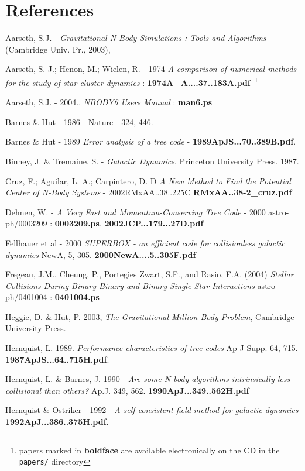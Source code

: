 \chapter                {References}


Aarseth, S.J. - 
{\it Gravitational N-Body Simulations : Tools and Algorithms} 
(Cambridge Univ. Pr., 2003),

Aarseth, S. J.; Henon, M.; Wielen, R. - 1974
{\it A comparison of numerical methods for the study of star cluster 
dynamics} : {\bf 1974A+A....37..183A.pdf}~\footnote{papers marked 
in {\bf boldface} are available electronically on the CD in the {\tt papers/} directory}

Aarseth, S.J. - 2004.. {\it NBODY6 Users Manual} : {\bf man6.ps}

Barnes \& Hut - 1986 - Nature - 324, 446.

Barnes \& Hut - 1989
{\it Error analysis of a tree code} - {\bf 1989ApJS...70..389B.pdf}.

Binney, J. \& Tremaine, S. - {\it Galactic Dynamics}, Princeton University Press. 1987.

Cruz, F.; Aguilar, L. A.; Carpintero, D. D
{\it A New Method to Find the Potential Center of N-Body Systems} - 2002RMxAA..38..225C
{\bf RMxAA..38-2\_cruz.pdf}

Dehnen, W. - {\it A Very Fast and Momentum-Conserving Tree Code} - 2000
astro-ph/0003209 : {\bf 0003209.ps}, {\bf 2002JCP...179...27D.pdf}

Fellhauer et al - 2000 
{\it SUPERBOX - an efficient code for collisionless galactic dynamics}
NewA, 5, 305. {\bf 2000NewA....5..305F.pdf} 

Fregeau, J.M., Cheung, P., Portegies Zwart, S.F., and Rasio, F.A. (2004)
{\it Stellar Collisions During Binary-Binary and Binary-Single Star Interactions}
astro-ph/0401004 : {\bf 0401004.ps}

Heggie, D. \& Hut, P. 2003, 
{\it The Gravitational Million-Body Problem}, 
Cambridge University Press.

Hernquist, L. 1989. {\it Performance characteristics of tree codes} Ap J Supp. 64, 715.
{\bf 1987ApJS...64..715H.pdf}.

Hernquist, L. \& Barnes, J. 1990 - 
{\it Are some N-body algorithms intrinsically less collisional than others?}
Ap.J. 349,  562. {\bf 1990ApJ...349..562H.pdf}

Hernquist \& Ostriker - 1992 - {\it A self-consistent field method for galactic dynamics}
{\bf 1992ApJ...386..375H.pdf}.

